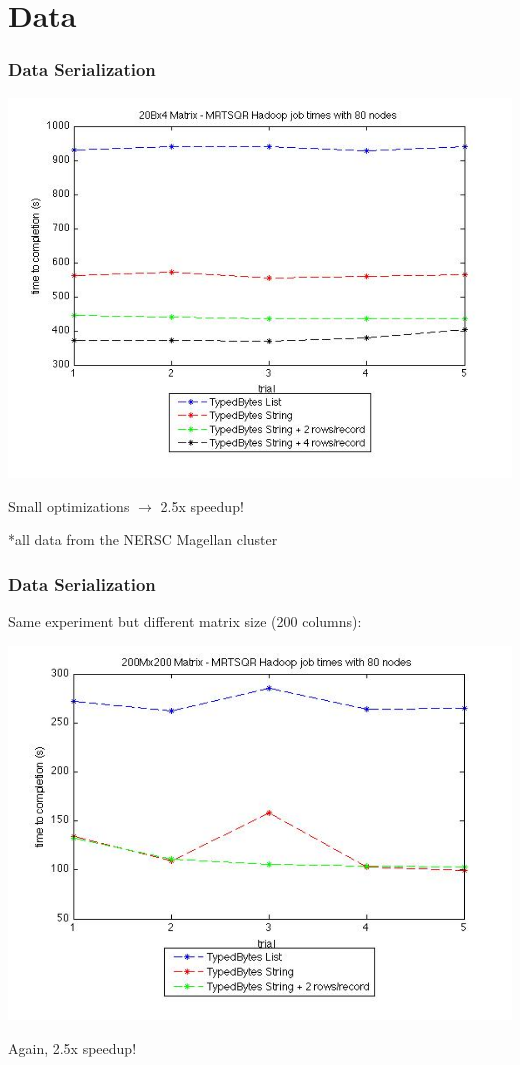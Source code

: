 \documentclass{beamer}
\begin{document}
\section{Data}

\begin{frame}
\frametitle{Data Serialization}

\begin{center}
\includegraphics[height=2.in]{./images/A_20B_4_ser.jpg}
\end{center}

Small optimizations $\rightarrow$ 2.5x speedup!

\vspace{0.1in}

*all data from the NERSC Magellan cluster

\end{frame}

\begin{frame}
\frametitle{Data Serialization}

Same experiment but different matrix size (200 columns):

\begin{center}
\includegraphics[height=2.in]{./images/A_200M_200_ser.jpg}
\end{center}

Again, 2.5x speedup!

\end{frame}
\end{document}
